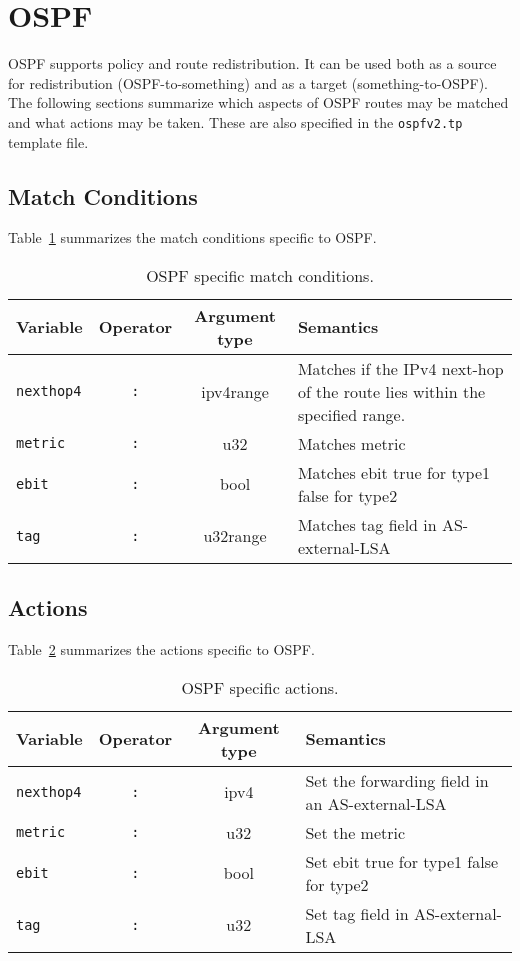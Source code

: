 \section{OSPF}
OSPF supports policy and route redistribution.  It can be used both as
a source for redistribution (OSPF-to-something) and as a target
(something-to-OSPF). The following sections summarize which aspects of
OSPF routes may be matched and what actions may be taken. These are
also specified in the {\tt ospfv2.tp} template file.

\subsection{Match Conditions}
Table~\ref{policy_ospf_match} summarizes the match conditions specific to OSPF.
\begin{table}[h]
\centering
\begin{tabular}{|l|c|c|p{7cm}|}
\hline
Variable & Operator & Argument type & Semantics \\
\hline\hline
{\tt nexthop4} & {\tt :} & ipv4range & Matches if the IPv4 next-hop of the route
lies within the specified range.\\

\hline
{\tt metric} & {\tt :} & u32 & Matches metric \\
\hline

\hline
{\tt ebit} & {\tt :} & bool & Matches ebit true for type1 false for type2 \\
\hline

\hline
{\tt tag} & {\tt :} & u32range & Matches tag field in AS-external-LSA \\
\hline

\end{tabular}
\caption{\label{policy_ospf_match}OSPF specific match conditions.}
\end{table}

\subsection{Actions}
Table~\ref{policy_ospf_action} summarizes the actions specific to OSPF.
\begin{table}[h]
\centering
\begin{tabular}{|l|c|c|p{7cm}|}
\hline
Variable & Operator & Argument type & Semantics \\
\hline\hline
{\tt nexthop4} & {\tt :} & ipv4 & Set the forwarding field in an
AS-external-LSA \\

\hline
{\tt metric} & {\tt :} & u32 & Set the metric \\
\hline

\hline
{\tt ebit} & {\tt :} & bool & Set ebit true for type1 false for type2 \\
\hline

\hline
{\tt tag} & {\tt :} & u32 & Set tag field in AS-external-LSA \\
\hline

\end{tabular}
\caption{\label{policy_ospf_action}OSPF specific actions.}
\end{table}

